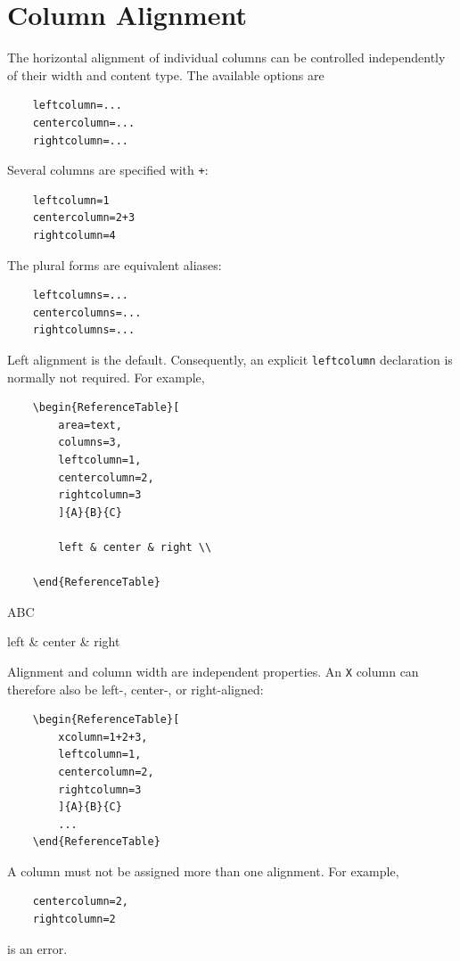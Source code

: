 \documentclass[
11pt,
a4paper,
oneside
]{scrbook}
\begin{document}
{%
\section{Column Alignment}

The horizontal alignment of individual columns can be controlled
independently of their width and content type.
The available options are
\begin{verbatim}
	leftcolumn=...
	centercolumn=...
	rightcolumn=...
\end{verbatim}
Several columns are specified with \texttt{+}:
\begin{verbatim}
	leftcolumn=1
	centercolumn=2+3
	rightcolumn=4
\end{verbatim}
The plural forms are equivalent aliases:
\begin{verbatim}
	leftcolumns=...
	centercolumns=...
	rightcolumns=...
\end{verbatim}
Left alignment is the default. Consequently, an explicit
\texttt{leftcolumn} declaration is normally not required.
For example,
\begin{verbatim}
	\begin{ReferenceTable}[
		area=text,
		columns=3,
		leftcolumn=1,
		centercolumn=2,
		rightcolumn=3
		]{A}{B}{C}
		
		left & center & right \\
		
	\end{ReferenceTable}
\end{verbatim}

\begin{ReferenceTable}[
	area=text,
	columns=3,
	leftcolumn=1,
	centercolumn=2,
	rightcolumn=3
	]{A}{B}{C}
	
	left & center & right \\
	
\end{ReferenceTable}

\noindent Alignment and column width are independent properties. An \texttt{X} column
can therefore also be left-, center-, or right-aligned:
\begin{verbatim}
	\begin{ReferenceTable}[
		xcolumn=1+2+3,
		leftcolumn=1,
		centercolumn=2,
		rightcolumn=3
		]{A}{B}{C}
		...
	\end{ReferenceTable}
\end{verbatim}
A column must not be assigned more than one alignment. For example,
\begin{verbatim}
	centercolumn=2,
	rightcolumn=2
\end{verbatim}
is an error.

}
\end{document}
